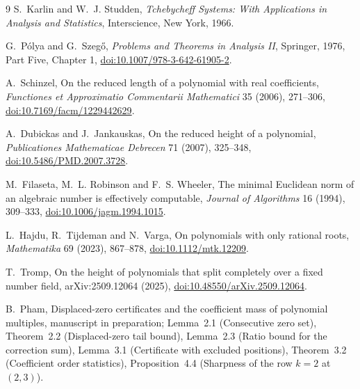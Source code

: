 \documentclass[11pt]{article}
\theoremstyle{definition}
\theoremstyle{plain}
\begin{document}
\begin{thebibliography}{9}
\small
{}
S.~Karlin and W.~J. Studden,
\newblock \emph{Tchebycheff Systems: With Applications in Analysis and Statistics},
\newblock Interscience, New York, 1966.

G.~P\'olya and G.~Szeg\H{o},
\newblock \emph{Problems and Theorems in Analysis II},
\newblock Springer, 1976, Part Five, Chapter 1,
\newblock \href{https://doi.org/10.1007/978-3-642-61905-2}
{doi:10.1007/978-3-642-61905-2}.

A.~Schinzel,
\newblock On the reduced length of a polynomial with real coefficients,
\newblock \emph{Functiones et Approximatio Commentarii Mathematici} 35 (2006), 271--306,
\newblock \href{https://doi.org/10.7169/facm/1229442629}
{doi:10.7169/facm/1229442629}.

A.~Dubickas and J.~Jankauskas,
\newblock On the reduced height of a polynomial,
\newblock \emph{Publicationes Mathematicae Debrecen} 71 (2007), 325--348,
\newblock \href{https://doi.org/10.5486/PMD.2007.3728}
{doi:10.5486/PMD.2007.3728}.

M.~Filaseta, M.~L. Robinson and F.~S. Wheeler,
\newblock The minimal Euclidean norm of an algebraic number is effectively
computable,
\newblock \emph{Journal of Algorithms} 16 (1994), 309--333,
\newblock \href{https://doi.org/10.1006/jagm.1994.1015}
{doi:10.1006/jagm.1994.1015}.

L.~Hajdu, R.~Tijdeman and N.~Varga,
\newblock On polynomials with only rational roots,
\newblock \emph{Mathematika} 69 (2023), 867--878,
\newblock \href{https://doi.org/10.1112/mtk.12209}
{doi:10.1112/mtk.12209}.

T.~Tromp,
\newblock On the height of polynomials that split completely over a fixed
number field,
\newblock arXiv:2509.12064 (2025),
\newblock \href{https://doi.org/10.48550/arXiv.2509.12064}
{doi:10.48550/arXiv.2509.12064}.

B.~Pham,
\newblock Displaced-zero certificates and the coefficient mass of polynomial
multiples,
\newblock manuscript in preparation;
Lemma~2.1 (Consecutive zero set), Theorem~2.2 (Displaced-zero tail bound),
Lemma~2.3 (Ratio bound for the correction sum),
Lemma~3.1 (Certificate with excluded positions), Theorem~3.2 (Coefficient order statistics),
Proposition~4.4 (Sharpness of the row $k=2$ at $(2,3)$).
\end{thebibliography}
\end{document}
